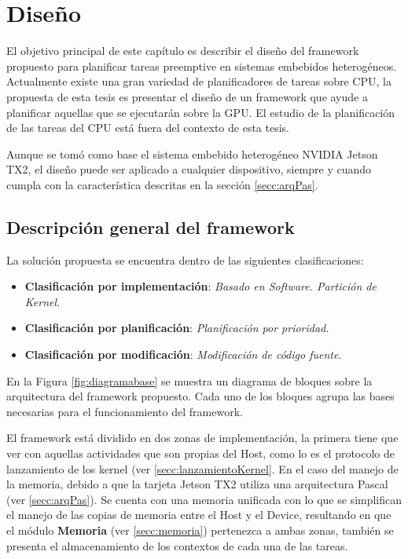 

\chapter{Diseño}\label{cha:Diseño}

El objetivo principal de este capítulo es describir el diseño del framework propuesto para planificar tareas preemptive en sistemas embebidos heterogéneos. Actualmente existe una gran variedad de planificadores de tareas sobre CPU, la propuesta de esta tesis es presentar el diseño de un framework que ayude a planificar aquellas que se ejecutarán sobre la GPU. El estudio de la planificación de las tareas del CPU está fuera del contexto de esta tesis.
\newline

Aunque se tomó como base el sistema embebido heterogéneo NVIDIA Jetson TX2, el diseño puede ser aplicado a cualquier dispositivo, siempre y cuando cumpla con la característica descritas en la sección \ref{secc:arqPas}.

\section{Descripción general del framework}

La solución propuesta se encuentra dentro de las siguientes clasificaciones:
\begin{itemize}
    \item \textbf{Clasificación por implementación}: \textit{Basado en Software. Partición de Kernel.}
    \item \textbf{Clasificación por planificación}: \textit{Planificación por prioridad.}
    \item \textbf{Clasificación por modificación}: \textit{Modificación de código fuente.}
\end{itemize}

En la Figura \ref{fig:diagramabase} se muestra un diagrama de bloques sobre la arquitectura del framework propuesto. Cada uno de los bloques agrupa las bases necesarias para el funcionamiento del framework.
\newline

El framework está dividido en dos zonas de implementación, la primera tiene que ver con aquellas actividades que son propias del Host, como lo es el protocolo de lanzamiento de los kernel (ver \ref{secc:lanzamientoKernel}. En el caso del manejo de la memoria, debido a que la tarjeta Jetson TX2 utiliza una arquitectura Pascal (ver \ref{secc:arqPas}). Se cuenta con una memoria unificada con lo que se simplifican el manejo de las copias de memoria entre el Host y el Device, resultando en que el módulo \textbf{Memoria} (ver \ref{secc:memoria}) pertenezca a ambas zonas, también se presenta el almacenamiento de los contextos de cada una de las tareas.

